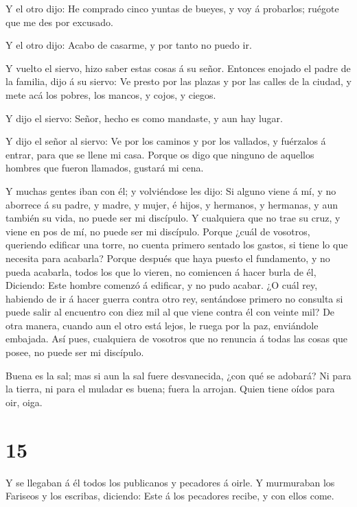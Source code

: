  Y el otro dijo: He comprado cinco yuntas de bueyes, y voy
á probarlos; ruégote que me des por excusado.

 Y el otro dijo: Acabo de casarme, y por tanto no puedo ir.

 Y vuelto el siervo, hizo saber estas cosas á su señor.
Entonces enojado el padre de la familia, dijo á su siervo: Ve presto por
las plazas y por las calles de la ciudad, y mete acá los pobres, los
mancos, y cojos, y ciegos.

 Y dijo el siervo: Señor, hecho es como mandaste, y aun hay
lugar.

 Y dijo el señor al siervo: Ve por los caminos y por los
vallados, y fuérzalos á entrar, para que se llene mi casa. 
Porque os digo que ninguno de aquellos hombres que fueron llamados,
gustará mi cena.

 Y muchas gentes iban con él; y volviéndose les dijo:
 Si alguno viene á mí, y no aborrece á su padre, y madre, y
mujer, é hijos, y hermanos, y hermanas, y aun también su vida, no puede
ser mi discípulo.  Y cualquiera que no trae su cruz, y
viene en pos de mí, no puede ser mi discípulo.  Porque
¿cuál de vosotros, queriendo edificar una torre, no cuenta primero
sentado los gastos, si tiene lo que necesita para acabarla?
 Porque después que haya puesto el fundamento, y no pueda
acabarla, todos los que lo vieren, no comiencen á hacer burla de él,
 Diciendo: Este hombre comenzó á edificar, y no pudo
acabar.  ¿O cuál rey, habiendo de ir á hacer guerra contra
otro rey, sentándose primero no consulta si puede salir al encuentro con
diez mil al que viene contra él con veinte mil?  De otra
manera, cuando aun el otro está lejos, le ruega por la paz, enviándole
embajada.  Así pues, cualquiera de vosotros que no renuncia
á todas las cosas que posee, no puede ser mi discípulo.

 Buena es la sal; mas si aun la sal fuere desvanecida, ¿con
qué se adobará?  Ni para la tierra, ni para el muladar es
buena; fuera la arrojan. Quien tiene oídos para oir, oiga.

\hypertarget{section-14}{%
\section{15}\label{section-14}}

 Y se llegaban á él todos los publicanos y pecadores á
oirle.  Y murmuraban los Fariseos y los escribas, diciendo:
Este á los pecadores recibe, y con ellos come.

